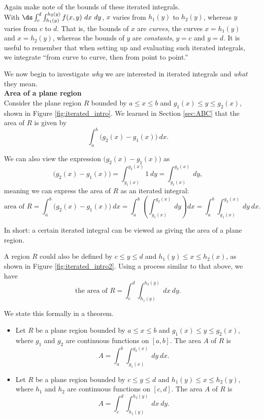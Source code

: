 Again make note of the bounds of these iterated integrals.\\
With $\ds \int_c^d\int_{h_1(y)}^{h_2(y)} f(x,y)\ dx\ dy$, $x$ varies from $h_1(y)$ to $h_2(y)$, whereas $y$ varies from $c$ to $d$. That is, the bounds of $x$ are \textit{curves}, the curves $x=h_1(y)$ and $x=h_2(y)$, whereas the bounds of $y$ are \textit{constants}, $y=c$ and $y=d$. It is useful to remember that when setting up and evaluating such iterated integrals, we integrate ``from curve to curve, then from point to point.''

We now begin to investigate \textit{why} we are interested in iterated integrals and \textit{what} they mean.\\

\noindent\textbf{\large Area of a plane region}\\

Consider the plane region $R$ bounded by $a\leq x\leq b$ and $g_1(x)\leq y\leq g_2(x)$, shown in Figure \ref{fig:iterated_intro}. We learned in Section \ref{sec:ABC} that the area of $R$ is given by $$\int_a^b \big(g_2(x)-g_1(x)\big)\ dx.$$

We can also view the expression $\big(g_2(x)-g_1(x)\big)$ as 
$$\big(g_2(x)-g_1(x)\big) = \int_{g_1(x)}^{g_2(x)} 1\ dy =\int_{g_1(x)}^{g_2(x)} \ dy,$$
meaning we can express the area of $R$ as an iterated integral:
$$\text{area of }R = \int_a^b \big(g_2(x)-g_1(x)\big)\ dx = \int_a^b\left(\int_{g_1(x)}^{g_2(x)} \ dy\right) dx =\int_a^b\int_{g_1(x)}^{g_2(x)} \ dy\ dx.$$

In short: a certain iterated integral can be viewed as giving the area of a plane region.

A region $R$ could also be defined by $c\leq y\leq d$ and $h_1(y)\leq x\leq h_2(x)$, as shown in Figure \ref{fig:iterated_intro2}. Using a process similar to that above, we have 
$$\text{the area of }R = \int_c^d\int_{h_1(y)}^{h_2(y)} \ dx\ dy.$$


We state this formally in a theorem.

{\begin{itemize}
	\item Let $R$ be a plane region bounded by $a\leq x\leq b$ and $g_1(x)\leq y\leq g_2(x)$, where $g_1$ and $g_2$ are continuous functions on $[a,b]$. The area $A$ of $R$ is
	$$A = \int_a^b\int_{g_1(x)}^{g_2(x)} \ dy\ dx.$$
	\item Let $R$ be a plane region bounded by $c\leq y\leq d$ and $h_1(y)\leq x\leq h_2(y)$, where $h_1$ and $h_2$ are continuous functions on $[c,d]$. The area $A$ of $R$ is
	$$A = \int_c^d\int_{h_1(y)}^{h_2(y)} \ dx\ dy.$$
\end{itemize}
}


